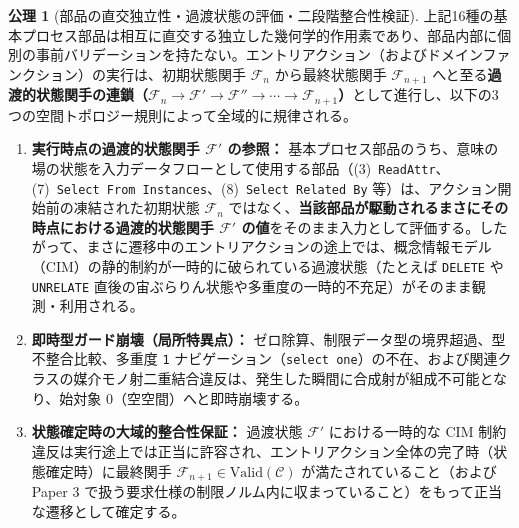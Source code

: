 \documentclass[11pt,a4paper]{ltjsarticle}
\theoremstyle{definition}
\newtheorem{axiom}{公理}[section]
\theoremstyle{plain}
\theoremstyle{remark}
\newcommand{\Valid}{\mathrm{Valid}}
\begin{document}
\begin{axiom}[部品の直交独立性・過渡状態の評価・二段階整合性検証]\label{ax:transient}
上記16種の基本プロセス部品は相互に直交する独立した幾何学的作用素であり、部品内部に個別の事前バリデーションを持たない。エントリアクション（およびドメインファンクション）の実行は、初期状態関手 $\mathcal{F}_n$ から最終状態関手 $\mathcal{F}_{n+1}$ へと至る\textbf{過渡的状態関手の連鎖（$\mathcal{F}_n \to \mathcal{F}' \to \mathcal{F}'' \to \cdots \to \mathcal{F}_{n+1}$）}として進行し、以下の3つの空間トポロジー規則によって全域的に規律される。
\begin{enumerate}
    \item \textbf{実行時点の過渡的状態関手 $\mathcal{F}'$ の参照：} 基本プロセス部品のうち、意味の場の状態を入力データフローとして使用する部品（(3)~\texttt{ReadAttr}、(7)~\texttt{Select From Instances}、(8)~\texttt{Select Related By} 等）は、アクション開始前の凍結された初期状態 $\mathcal{F}_n$ ではなく、\textbf{当該部品が駆動されるまさにその時点における過渡的状態関手 $\mathcal{F}'$ の値}をそのまま入力として評価する。したがって、まさに遷移中のエントリアクションの途上では、概念情報モデル（CIM）の静的制約が一時的に破られている過渡状態（たとえば \texttt{DELETE} や \texttt{UNRELATE} 直後の宙ぶらりん状態や多重度の一時的不充足）がそのまま観測・利用される。
    \item \textbf{即時型ガード崩壊（局所特異点）：} ゼロ除算、制限データ型の境界超過、型不整合比較、多重度 \texttt{1} ナビゲーション（\texttt{select one}）の不在、および関連クラスの媒介モノ射二重結合違反は、発生した瞬間に合成射が組成不可能となり、始対象 $0$（空空間）へと即時崩壊する。
    \item \textbf{状態確定時の大域的整合性保証：} 過渡状態 $\mathcal{F}'$ における一時的な CIM 制約違反は実行途上では正当に許容され、エントリアクション全体の完了時（状態確定時）に最終関手 $\mathcal{F}_{n+1} \in \Valid(\mathcal{C})$ が満たされていること（および Paper 3 で扱う要求仕様の制限ノルム内に収まっていること）をもって正当な遷移として確定する。
\end{enumerate}
\end{axiom}
\end{document}
